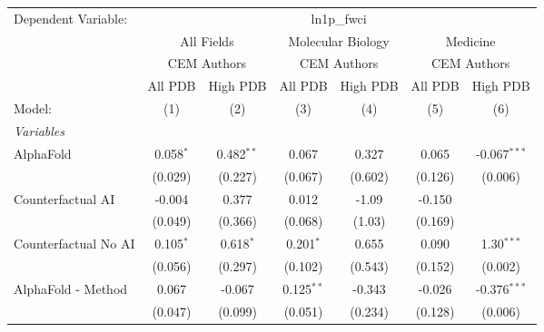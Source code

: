 \begingroup
\centering
\begin{tabular}{lcccccc}
   \tabularnewline \midrule \midrule
   Dependent Variable: & \multicolumn{6}{c}{ln1p\_fwci}\\
 & \multicolumn{2}{c}{All Fields} & \multicolumn{2}{c}{Molecular Biology} & \multicolumn{2}{c}{Medicine} \\
\cmidrule(lr){2-3} \cmidrule(lr){4-5} \cmidrule(lr){6-7}
 & \multicolumn{2}{c}{CEM Authors} & \multicolumn{2}{c}{CEM Authors} & \multicolumn{2}{c}{CEM Authors} \\
\cmidrule(lr){2-3} \cmidrule(lr){4-5} \cmidrule(lr){6-7}
 & \multicolumn{1}{c}{All PDB} & \multicolumn{1}{c}{High PDB} & \multicolumn{1}{c}{All PDB} & \multicolumn{1}{c}{High PDB} & \multicolumn{1}{c}{All PDB} & \multicolumn{1}{c}{High PDB} \\
\cmidrule(lr){2-2} \cmidrule(lr){3-3} \cmidrule(lr){4-4} \cmidrule(lr){5-5} \cmidrule(lr){6-6} \cmidrule(lr){7-7}
   Model:                                                     & (1)           & (2)            & (3)           & (4)         & (5)     & (6)\\  
   \midrule
   \emph{Variables}\\
   AlphaFold                                                  & 0.058$^{*}$   & 0.482$^{**}$   & 0.067         & 0.327       & 0.065   & -0.067$^{***}$\\   
                                                              & (0.029)       & (0.227)        & (0.067)       & (0.602)     & (0.126) & (0.006)\\   
   Counterfactual AI                                          & -0.004        & 0.377          & 0.012         & -1.09       & -0.150  &   \\   
                                                              & (0.049)       & (0.366)        & (0.068)       & (1.03)      & (0.169) &   \\   
   Counterfactual No AI                                       & 0.105$^{*}$   & 0.618$^{*}$    & 0.201$^{*}$   & 0.655       & 0.090   & 1.30$^{***}$\\   
                                                              & (0.056)       & (0.297)        & (0.102)       & (0.543)     & (0.152) & (0.002)\\   
   AlphaFold - Method                                         & 0.067         & -0.067         & 0.125$^{**}$  & -0.343      & -0.026  & -0.376$^{***}$\\   
                                                              & (0.047)       & (0.099)        & (0.051)       & (0.234)     & (0.128) & (0.006)\\   

\end{tabular}
